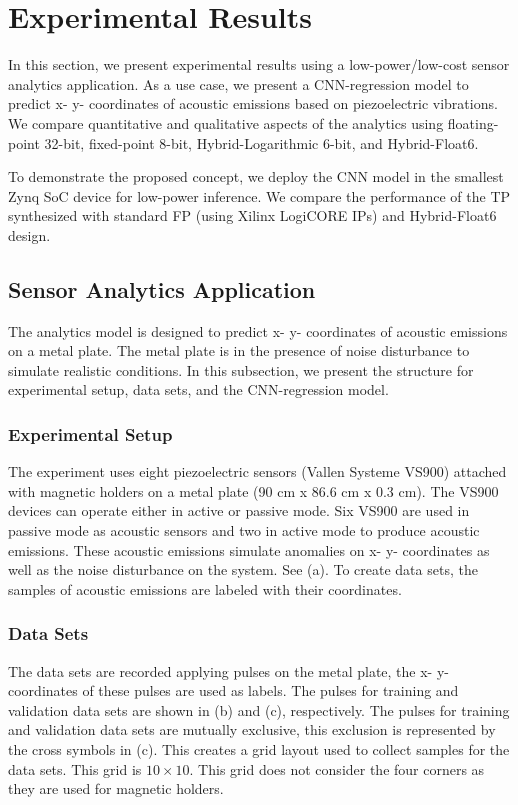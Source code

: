 \section{Experimental Results}
\label{sec:experimental_results}
In this section, we present experimental results using a low-power/low-cost sensor analytics application. As a use case, we present a CNN-regression model to predict x- y- coordinates of acoustic emissions based on piezoelectric vibrations. We compare quantitative and qualitative aspects of the analytics using floating-point 32-bit, fixed-point 8-bit, Hybrid-Logarithmic 6-bit, and Hybrid-Float6.

To demonstrate the proposed concept, we deploy the CNN model in the smallest Zynq SoC device for low-power inference. We compare the performance of the TP synthesized with standard FP (using Xilinx LogiCORE IPs) and Hybrid-Float6 design.

\subsection{Sensor Analytics Application}
The analytics model is designed to predict x- y- coordinates of acoustic emissions on a metal plate. The metal plate is in the presence of noise disturbance to simulate realistic conditions. In this subsection, we present the structure for experimental setup, data sets, and the CNN-regression model.

\subsubsection{Experimental Setup}
The experiment uses eight piezoelectric sensors (Vallen Systeme VS900) attached with magnetic holders on a metal plate (90 cm x 86.6 cm x 0.3 cm). The VS900 devices can operate either in active or passive mode. Six VS900 are used in passive mode as acoustic sensors and two in active mode to produce acoustic emissions. These acoustic emissions simulate anomalies on x- y- coordinates as well as the noise disturbance on the system. See (a). To create data sets, the samples of acoustic emissions are labeled with their coordinates.

\subsubsection{Data Sets}
The data sets are recorded applying pulses on the metal plate, the x- y- coordinates of these pulses are used as labels. The pulses for training and validation data sets are shown in (b) and (c), respectively. The pulses for training and validation data sets are mutually exclusive, this exclusion is represented by the cross symbols in (c). This creates a grid layout used to collect samples for the data sets. This grid is $10\times10$. This grid does not consider the four corners as they are used for magnetic holders.

